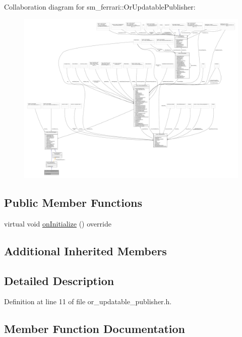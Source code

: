 Collaboration diagram for sm\+\_\+ferrari\+:\+:Or\+Updatable\+Publisher\+:
\nopagebreak
\begin{figure}[H]
\begin{center}
\leavevmode
\includegraphics[width=350pt]{classsm__ferrari_1_1OrUpdatablePublisher__coll__graph}
\end{center}
\end{figure}
\subsection*{Public Member Functions}
\begin{DoxyCompactItemize}
\item 
virtual void \hyperlink{classsm__ferrari_1_1OrUpdatablePublisher_a0ef077e6f16d4394e5570d847bd0067d}{on\+Initialize} () override
\end{DoxyCompactItemize}
\subsection*{Additional Inherited Members}


\subsection{Detailed Description}


Definition at line 11 of file or\+\_\+updatable\+\_\+publisher.\+h.



\subsection{Member Function Documentation}
\mbox{\label{classsm__ferrari_1_1OrUpdatablePublisher_a0ef077e6f16d4394e5570d847bd0067d}} 
